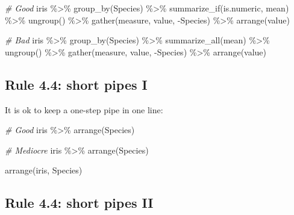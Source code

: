 \documentclass[
  letterpaper,
  DIV=11,
  numbers=noendperiod]{scrreprt}
\newenvironment{Shaded}{}{}
\newcommand{\CommentTok}[1]{\textcolor[rgb]{0.38,0.63,0.69}{\textit{#1}}}
\newcommand{\FunctionTok}[1]{\textcolor[rgb]{0.02,0.16,0.49}{#1}}
\newcommand{\NormalTok}[1]{#1}
\newcommand{\SpecialCharTok}[1]{\textcolor[rgb]{0.25,0.44,0.63}{#1}}
\begin{document}
\begin{Shaded}
\begin{Highlighting}[]
\CommentTok{\# Good}
\NormalTok{iris }\SpecialCharTok{\%\textgreater{}\%}
  \FunctionTok{group\_by}\NormalTok{(Species) }\SpecialCharTok{\%\textgreater{}\%}
  \FunctionTok{summarize\_if}\NormalTok{(is.numeric, mean) }\SpecialCharTok{\%\textgreater{}\%}
  \FunctionTok{ungroup}\NormalTok{() }\SpecialCharTok{\%\textgreater{}\%}
  \FunctionTok{gather}\NormalTok{(measure, value, }\SpecialCharTok{{-}}\NormalTok{Species) }\SpecialCharTok{\%\textgreater{}\%}
  \FunctionTok{arrange}\NormalTok{(value)}

\CommentTok{\# Bad}
\NormalTok{iris }\SpecialCharTok{\%\textgreater{}\%} \FunctionTok{group\_by}\NormalTok{(Species) }\SpecialCharTok{\%\textgreater{}\%} \FunctionTok{summarize\_all}\NormalTok{(mean) }\SpecialCharTok{\%\textgreater{}\%} 
\FunctionTok{ungroup}\NormalTok{() }\SpecialCharTok{\%\textgreater{}\%} \FunctionTok{gather}\NormalTok{(measure, value, }\SpecialCharTok{{-}}\NormalTok{Species) }\SpecialCharTok{\%\textgreater{}\%}
\FunctionTok{arrange}\NormalTok{(value)}
\end{Highlighting}
\end{Shaded}

\subsection{Rule 4.4: short pipes I}\label{rule-4.4-short-pipes-i}

It is ok to keep a one-step pipe in one line:

\begin{Shaded}
\begin{Highlighting}[]
\CommentTok{\# Good}
\NormalTok{iris }\SpecialCharTok{\%\textgreater{}\%} \FunctionTok{arrange}\NormalTok{(Species)}

\CommentTok{\# Mediocre}
\NormalTok{iris }\SpecialCharTok{\%\textgreater{}\%}
  \FunctionTok{arrange}\NormalTok{(Species)}

\FunctionTok{arrange}\NormalTok{(iris, Species)}
\end{Highlighting}
\end{Shaded}

\subsection{Rule 4.4: short pipes II}\label{rule-4.4-short-pipes-ii}
\end{document}
